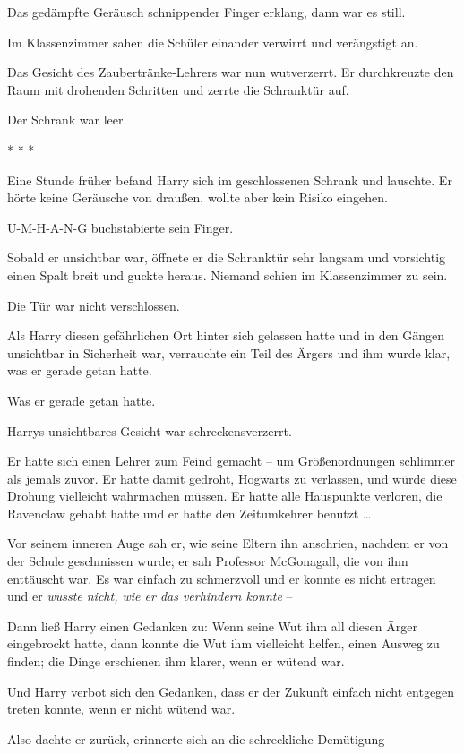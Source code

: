 {Das gedämpfte Geräusch schnippender Finger erklang, dann war es still.

Im Klassenzimmer sahen die Schüler einander verwirrt und verängstigt an.

Das Gesicht des Zaubertränke-Lehrers war nun wutverzerrt. Er durchkreuzte den Raum mit drohenden Schritten und zerrte die Schranktür auf.

Der Schrank war leer.

* * *

Eine Stunde früher befand Harry sich im geschlossenen Schrank und lauschte. Er hörte keine Geräusche von draußen, wollte aber kein Risiko eingehen.

U-M-H-A-N-G buchstabierte sein Finger.

Sobald er unsichtbar war, öffnete er die Schranktür sehr langsam und vorsichtig einen Spalt breit und guckte heraus. Niemand schien im Klassenzimmer zu sein.

Die Tür war nicht verschlossen.

Als Harry diesen gefährlichen Ort hinter sich gelassen hatte und in den Gängen unsichtbar in Sicherheit war, verrauchte ein Teil des Ärgers und ihm wurde klar, was er gerade getan hatte.

Was er gerade getan hatte.

Harrys unsichtbares Gesicht war schreckensverzerrt.

Er hatte sich einen Lehrer zum Feind gemacht -- um Größenordnungen schlimmer als jemals zuvor. Er hatte damit gedroht, Hogwarts zu verlassen, und würde diese Drohung vielleicht wahrmachen müssen. Er hatte alle Hauspunkte verloren, die Ravenclaw gehabt hatte und er hatte den Zeitumkehrer benutzt …

Vor seinem inneren Auge sah er, wie seine Eltern ihn anschrien, nachdem er von der Schule geschmissen wurde; er sah Professor McGonagall, die von ihm enttäuscht war. Es war einfach zu schmerzvoll und er konnte es nicht ertragen und er \emph{wusste nicht, wie er das verhindern konnte} --

Dann ließ Harry einen Gedanken zu: Wenn seine Wut ihm all diesen Ärger eingebrockt hatte, dann konnte die Wut ihm vielleicht helfen, einen Ausweg zu finden; die Dinge erschienen ihm klarer, wenn er wütend war.

Und Harry verbot sich den Gedanken, dass er der Zukunft einfach nicht entgegen treten konnte, wenn er nicht wütend war.

Also dachte er zurück, erinnerte sich an die schreckliche Demütigung --

}
